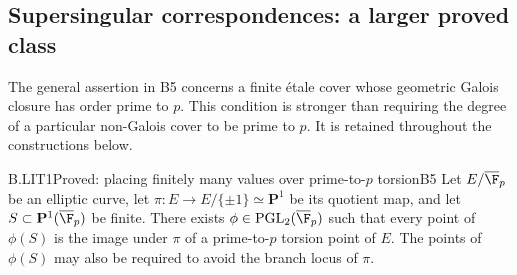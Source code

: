 \subsection{Supersingular correspondences: a larger proved class}

The general assertion in B5 concerns a finite \'etale cover whose
geometric Galois closure has order prime to $p$. This condition is
stronger than requiring the degree of a particular non-Galois cover
to be prime to $p$. It is retained throughout the constructions below.

\begin{claim}{B.LIT1}{Proved: placing finitely many values over prime-to-$p$ torsion}{B5}
Let $E/\overline{\F}_p$ be an elliptic curve, let
$\pi:E\to E/\{\pm1\}\simeq\mathbf P^1$ be its quotient map, and
let $S\subset\mathbf P^1(\overline{\F}_p)$ be finite. There exists
$\phi\in\mathrm{PGL}_2(\overline{\F}_p)$ such that every point of
$\phi(S)$ is the image under $\pi$ of a prime-to-$p$ torsion point
of $E$. The points of $\phi(S)$ may also be required to avoid the
branch locus of $\pi$.
\end{claim}
